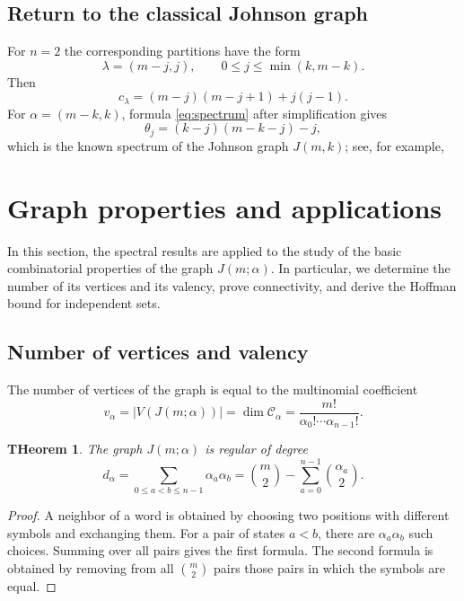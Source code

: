 \documentclass[12pt,reqno]{amsart}
\newtheorem{theorem}{THeorem}[section]
\begin{document}
\subsection{Return to the classical Johnson graph}

For $n=2$ the corresponding partitions have the form
$$
\lambda=(m-j,j),
\qquad
0\le j\le\min(k,m-k).
$$
Then
$$
c_\lambda
=
(m-j)(m-j+1)+j(j-1).
$$
For $\alpha=(m-k,k)$, formula \eqref{eq:spectrum} after simplification
gives
$$
\theta_j
=
(k-j)(m-k-j)-j,
$$
which is the known spectrum of the Johnson graph $J(m,k)$; see, for
example, \cite[Theorem 9.1.2]{BrouwerCohenNeumaier1989}


\section{Graph properties and applications}
\label{sec:applications}

In this section, the spectral results are applied to the study of the
basic combinatorial properties of the graph $J(m;\alpha)$. In particular,
we determine the number of its vertices and its valency, prove
connectivity, and derive the Hoffman bound for independent sets.


\subsection{Number of vertices and valency}

The number of vertices of the graph is equal to the multinomial
coefficient
\begin{equation*}
v_\alpha
=
|V(J(m;\alpha))|
=
\dim\mathcal C_\alpha
=
\frac{m!}{\alpha_0!\cdots\alpha_{n-1}!}.
\end{equation*}

\begin{theorem}
The graph $J(m;\alpha)$ is regular of degree
\begin{equation*}
d_\alpha
=
\sum_{0\le a<b\le n-1}\alpha_a\alpha_b
=
\binom m2-
\sum_{a=0}^{n-1}\binom{\alpha_a}{2}.
\end{equation*}
\end{theorem}

\begin{proof}
A neighbor of a word is obtained by choosing two positions with different
symbols and exchanging them. For a pair of states $a<b$, there are
$\alpha_a\alpha_b$ such choices. Summing over all pairs gives the first
formula. The second formula is obtained by removing from all $\binom m2$
pairs those pairs in which the symbols are equal.
\end{proof}
\end{document}
